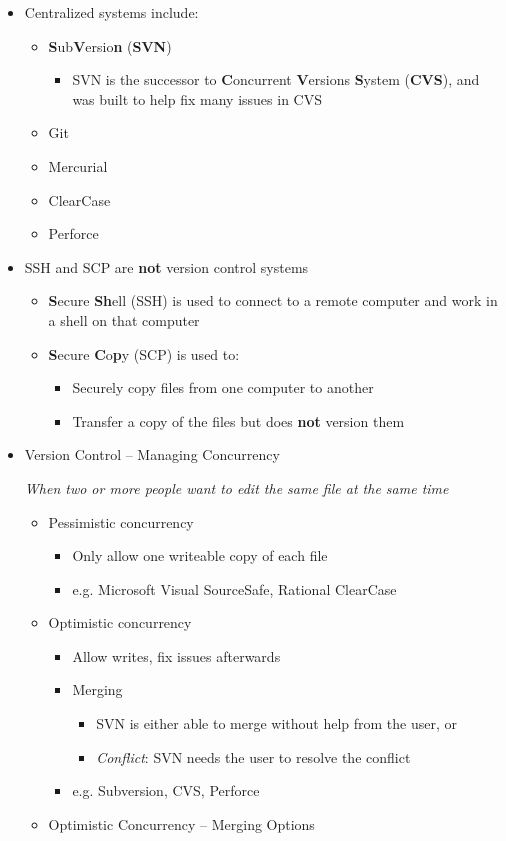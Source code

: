 \documentclass[11pt]{article}
\begin{document}
\begin{itemize}
	\item Centralized systems include:
		\begin{itemize}
			\item \textbf{S}ub\textbf{V}ersio\textbf{n} (\textbf{SVN})
				\begin{itemize}
					\item SVN is the successor to \textbf{C}oncurrent \textbf{V}ersions \textbf{S}ystem (\textbf{CVS}), and was built to help fix many issues in CVS
				\end{itemize}
			\item Git
			\item Mercurial
			\item ClearCase
			\item Perforce
		\end{itemize}

	\item SSH and SCP are \textbf{not} version control systems
		\begin{itemize}
			\item \textbf{S}ecure \textbf{Sh}ell (SSH) is used to connect to a remote computer and work in a shell on that computer
			\item \textbf{S}ecure \textbf{C}o\textbf{p}y (SCP) is used to:
				\begin{itemize}
					\item Securely copy files from one computer to another
					\item Transfer a copy of the files but does \textbf{not} version them
				\end{itemize}
		\end{itemize}

	\item Version Control – Managing Concurrency

		\emph{When two or more people want to edit the same file at the same time}
			\begin{itemize}
				\item Pessimistic concurrency
					\begin{itemize}
						\item Only allow one writeable copy of each file
						\item e.g. Microsoft Visual SourceSafe, Rational ClearCase
					\end{itemize}

				\item Optimistic concurrency
					\begin{itemize}
						\item Allow writes, fix issues afterwards
						\item Merging
							\begin{itemize}
								\item SVN is either able to merge without help from the user, or
								\item \textit{Conflict}: SVN needs the user to resolve the conflict
							\end{itemize}
						\item e.g. Subversion, CVS, Perforce
					\end{itemize}
				\newpage
				\item Optimistic Concurrency – Merging Options


\end{itemize}
\end{itemize}
\end{document}
